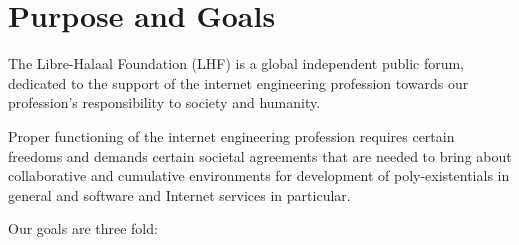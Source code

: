 \section*{Purpose and Goals}

\par 
The Libre-Halaal Foundation (LHF) is a global independent public forum,
dedicated to the support of the internet engineering profession towards 
our profession's responsibility to society and humanity.


\par 
Proper functioning of the internet engineering profession requires certain freedoms and
demands certain societal agreements that are needed to bring about collaborative and
cumulative environments for development of poly-existentials in general and software and
Internet services in particular.


\par Our goals are three fold:


